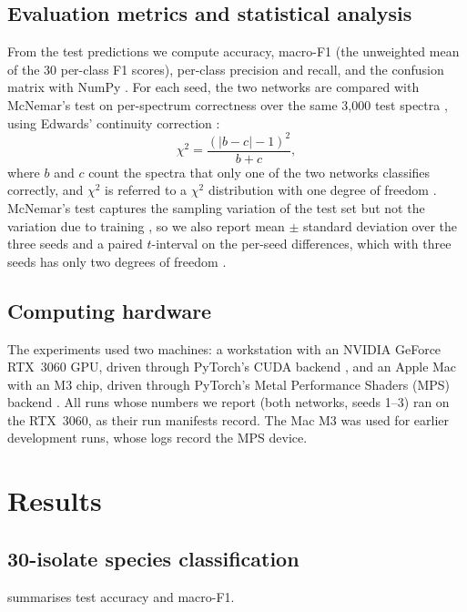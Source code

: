 \documentclass[journal,onecolumn]{IEEEtran}
\begin{document}
\subsection{Evaluation metrics and statistical analysis}
\label{sec:models-stats}
From the test predictions we compute accuracy, macro-F1 (the unweighted
mean of the 30 per-class F1 scores), per-class precision and recall, and the
confusion matrix with NumPy \cite{harris2020array}. For each seed, the two
networks are compared with McNemar's test on per-spectrum correctness over
the same 3{,}000 test spectra \cite{mcnemar1947note,dietterich1998approximate},
using Edwards' continuity correction \cite{edwards1948note}:
\begin{equation}
  \chi^2 = \frac{(\lvert b-c\rvert-1)^2}{b+c},
  \label{eq:mcnemar}
\end{equation}
where $b$ and $c$ count the spectra that only one of the two networks
classifies correctly, and $\chi^2$ is referred to a $\chi^2$ distribution
with one degree of freedom \cite{mcnemar1947note}. McNemar's test captures
the sampling variation of the test set but not the variation due to
training \cite{dietterich1998approximate}, so we also report mean $\pm$
standard deviation over the three seeds and a paired $t$-interval on the
per-seed differences, which with three seeds has only two degrees of
freedom \cite{dietterich1998approximate}.

\subsection{Computing hardware}
\label{sec:models-hardware}
The experiments used two machines: a workstation with an NVIDIA GeForce
RTX~3060 GPU, driven through PyTorch's CUDA backend
\cite{paszke2019pytorch}, and an Apple Mac with an M3 chip, driven through
PyTorch's Metal Performance Shaders (MPS) backend \cite{pytorchmps}. All
runs whose numbers we report (both networks, seeds 1--3) ran on the
RTX~3060, as their run manifests record. The Mac M3 was used for earlier
development runs, whose logs record the MPS device.

\section{Results}
\label{sec:results}

\subsection{30-isolate species classification}
\label{sec:res-isolate}
 summarises test accuracy and macro-F1.
\end{document}
